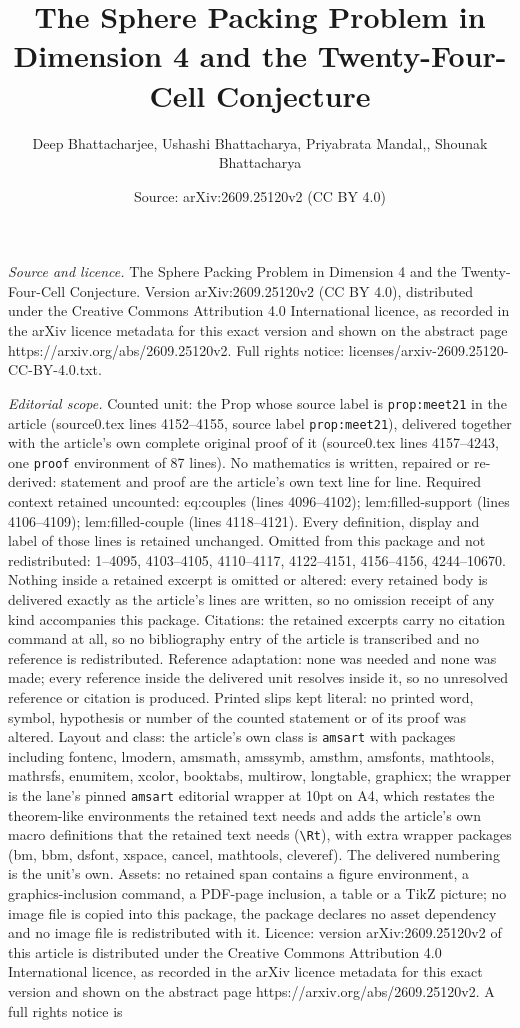 \documentclass[10pt,a4paper]{amsart}
\title[The Sphere Packing Problem in Dimension 4 and the Twenty-Fou]{The Sphere Packing Problem in Dimension 4 and the Twenty-Four-Cell Conjecture}
\author{Deep Bhattacharjee, Ushashi Bhattacharya, Priyabrata Mandal,, Shounak Bhattacharya}
\date{Source: arXiv:2609.25120v2 (CC BY 4.0)}
\begin{document}
\maketitle

\noindent\emph{Source and licence.} The Sphere Packing Problem in Dimension 4 and the Twenty-Four-Cell Conjecture. Version arXiv:2609.25120v2 (CC BY 4.0), distributed under the Creative Commons Attribution 4.0 International licence, as recorded in the arXiv licence metadata for this exact version and shown on the abstract page https://arxiv.org/abs/2609.25120v2. Full rights notice: licenses/arxiv-2609.25120-CC-BY-4.0.txt.\par\smallskip

\noindent\textit{Editorial scope.} Counted unit: the Prop whose source label is \texttt{prop:meet21} in the article (source0.tex lines 4152--4155, source label \texttt{prop:meet21}), delivered together with the article's own complete original proof of it (source0.tex lines 4157--4243, one \texttt{proof} environment of 87 lines). No mathematics is written, repaired or re-derived: statement and proof are the article's own text line for line. Required context retained uncounted: eq:couples (lines 4096--4102); lem:filled-support (lines 4106--4109); lem:filled-couple (lines 4118--4121). Every definition, display and label of those lines is retained unchanged. Omitted from this package and not redistributed: 1--4095, 4103--4105, 4110--4117, 4122--4151, 4156--4156, 4244--10670. Nothing inside a retained excerpt is omitted or altered: every retained body is delivered exactly as the article's lines are written, so no omission receipt of any kind accompanies this package. Citations: the retained excerpts carry no citation command at all, so no bibliography entry of the article is transcribed and no reference is redistributed. Reference adaptation: none was needed and none was made; every reference inside the delivered unit resolves inside it, so no unresolved reference or citation is produced. Printed slips kept literal: no printed word, symbol, hypothesis or number of the counted statement or of its proof was altered. Layout and class: the article's own class is \texttt{amsart} with packages including fontenc, lmodern, amsmath, amssymb, amsthm, amsfonts, mathtools, mathrsfs, enumitem, xcolor, booktabs, multirow, longtable, graphicx; the wrapper is the lane's pinned \texttt{amsart} editorial wrapper at 10pt on A4, which restates the theorem-like environments the retained text needs and adds the article's own macro definitions that the retained text needs (\texttt{\textbackslash Rt}), with extra wrapper packages (bm, bbm, dsfont, xspace, cancel, mathtools, cleveref). The delivered numbering is the unit's own. Assets: no retained span contains a figure environment, a graphics-inclusion command, a PDF-page inclusion, a table or a TikZ picture; no image file is copied into this package, the package declares no asset dependency and no image file is redistributed with it. Licence: version arXiv:2609.25120v2 of this article is distributed under the Creative Commons Attribution 4.0 International licence, as recorded in the arXiv licence metadata for this exact version and shown on the abstract page https://arxiv.org/abs/2609.25120v2. A full rights notice is 
\end{document}
